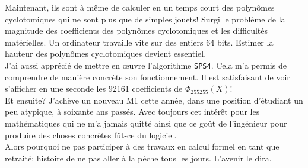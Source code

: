 \documentclass{article}
\theoremstyle{break}                  %
\begin{document}
Maintenant, ils sont à même de calculer en un temps court des polynômes cyclotomiques qui ne sont plus que de simples jouets! Surgi le problème de la magnitude des coefficients des polynômes cyclotomiques et les difficultés matérielles. Un ordinateur travaille vite sur des entiers 64 bits. Estimer la hauteur des polynômes cyclotomiques devient essentiel.\\

J'ai aussi apprécié de mettre en œuvre l'algorithme \texttt{SPS4}. Cela m'a permis de comprendre de manière concrète son fonctionnement. Il est satisfaisant de voir s'afficher en une seconde les 92161 coefficients de $\Phi_{255255}(X)$!\\

Et ensuite? J'achève un nouveau M1 cette année, dans une position d'étudiant un peu atypique, à soixante ans passés. Avec toujours cet intérêt pour les mathématiques qui ne m'a jamais quitté ainsi que ce goût de l'ingénieur pour produire des choses concrètes fût-ce du logiciel.\\

Alors pourquoi ne pas participer à des travaux en calcul formel en tant que retraité; histoire de ne pas aller à la pêche tous les jours. L'avenir le dira.
\end{document}
